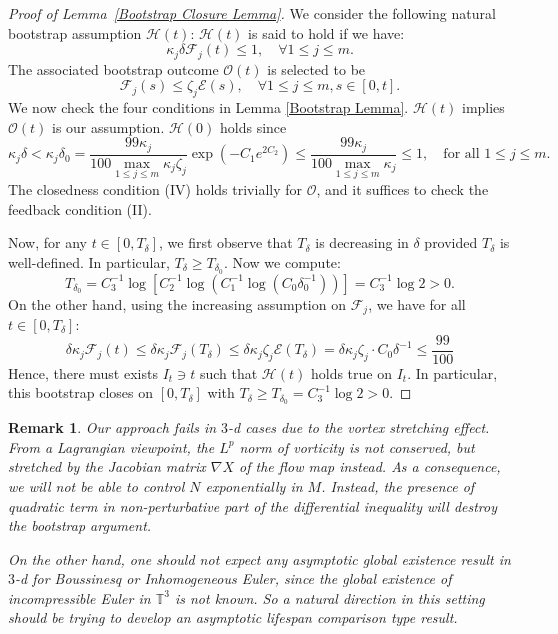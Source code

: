 \documentclass[12pt,letterpaper]{article}
\newtheorem{rmk}[thm]{Remark}
\theoremstyle{plain}
\begin{document}
\begin{proof}[Proof of Lemma~\ref{Bootstrap Closure Lemma}]
  We consider the following natural bootstrap assumption $\mathscr H(t)$: $\mathscr H(t)$ is said to hold if we have:
  \begin{equation*}
   \kappa_j\delta \mathcal F_j(t)\le 1,\quad\forall 1\le j\le m .   
  \end{equation*}
 The associated bootstrap outcome $\mathscr O(t)$ is selected to be
 \begin{equation*}
    \mathcal F_j(s)\le \zeta_j\mathcal E(s), \quad\forall 1\le j\le m, s\in [0,t].  
 \end{equation*}
 We now check the four conditions in Lemma \ref{Bootstrap Lemma}. $\mathscr H(t)$ implies $\mathscr O(t)$ is our assumption. $\mathscr H(0)$ holds since 
 \begin{equation*}
  \kappa_j\delta<\kappa_j \delta_0=\frac{99\kappa_j}{100\max_{1\le j\le m}\kappa_j\zeta_j}\exp(-C_1e^{2C_2})\le \frac{99\kappa_j}{100 \max_{1\le j\le m}\kappa_j}\le 1,\quad \text{for all }1\le j\le m.   
 \end{equation*}
 The closedness condition (IV) holds trivially for $\mathscr O$, and it suffices to check the feedback condition (II).

 Now, for any $t\in [0,T_\delta]$, we first observe that $T_\delta$ is decreasing in $\delta$ provided $T_\delta$ is well-defined. In particular, $T_{\delta}\ge T_{\delta_0}$. Now we compute:
 \begin{equation*}
 T_{\delta_0}=C_3^{-1}\log[C_2^{-1}\log(C_1^{-1}\log(C_0\delta_0^{-1}))] =C_3^{-1} \log 2>0.  
 \end{equation*}
 On the other hand, using the increasing assumption on $\mathcal F_j$, we have for all $t\in [0,T_\delta]$:
 \begin{equation}
 \delta \kappa_j\mathcal F_j(t) \le \delta \kappa_j\mathcal F_j(T_{\delta})\le \delta\kappa_j\zeta_j \mathcal E(T_\delta)=\delta\kappa_j\zeta_j \cdot C_0\delta^{-1} \le \frac{99}{100}  
 \end{equation}
Hence, there must exists $I_t\owns t$ such that $\mathscr H(t)$ holds true on $I_t$. In particular, this bootstrap closes on $[0,T_\delta]$ with $T_\delta\ge T_{\delta_0}= C_3^{-1}\log 2>0$.
\end{proof}

\begin{rmk}
  Our approach fails in $3$-d cases due to the vortex stretching effect. From a Lagrangian viewpoint, the $L^p$ norm of vorticity is not conserved, but stretched by the Jacobian matrix $\nabla X$ of the flow map instead. As a consequence, we will not be able to control $N$ exponentially in $M$. Instead, the presence of quadratic term in non-perturbative part of the differential inequality will destroy the bootstrap argument. 
  
  On the other hand, one should not expect any asymptotic global existence result in $3$-d for Boussinesq or Inhomogeneous Euler, since the global existence of incompressible Euler in $\mathbb T^3$ is not known. So a natural direction in this setting should be trying to develop an asymptotic lifespan comparison type result.
\end{rmk}
\end{document}
